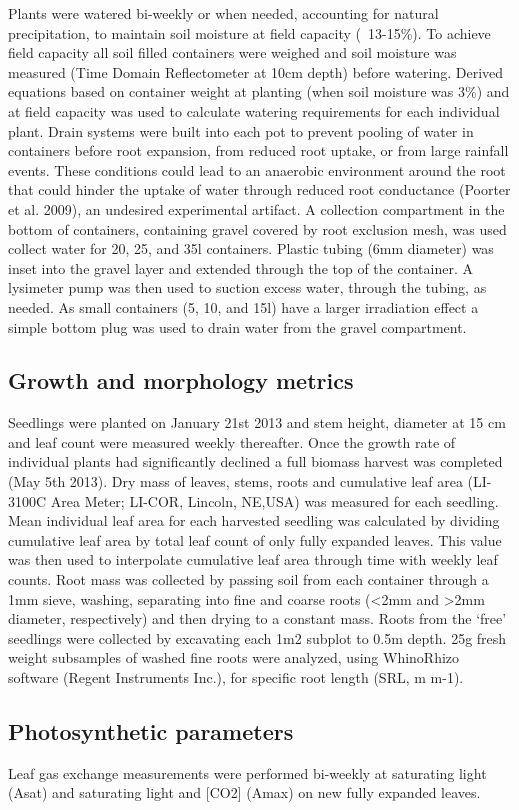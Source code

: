 \documentclass[a4paper]{article}\usepackage[]{graphicx}\usepackage[]{color}
\begin{document}
Plants were watered bi-weekly or when needed, accounting for natural precipitation, to maintain soil moisture at field capacity (~13-15\%). To achieve field capacity all soil filled containers were weighed and soil moisture was measured (Time Domain Reflectometer at 10cm depth) before watering. Derived equations based on container weight at planting (when soil moisture was 3\%) and at field capacity was used to calculate watering requirements for each individual plant. Drain systems were built into each pot to prevent pooling of water in containers before root expansion, from reduced root uptake, or from large rainfall events. These conditions could lead to an anaerobic environment around the root that could hinder the uptake of water through reduced root conductance (Poorter et al. 2009), an undesired experimental artifact. A collection compartment in the bottom of containers, containing gravel covered by root exclusion mesh, was used collect water for 20, 25, and 35l containers. Plastic tubing (6mm diameter) was inset into the gravel layer and extended through the top of the container. A lysimeter pump was then used to suction excess water, through the tubing, as needed. As small containers (5, 10, and 15l) have a larger irradiation effect a simple bottom plug was used to drain water from the gravel compartment.  

\subsection*{Growth and morphology metrics}
Seedlings were planted on January 21st 2013 and stem height, diameter at 15 cm and leaf count were measured weekly thereafter. Once the growth rate of individual plants had significantly declined a full biomass harvest was completed (May 5th 2013). Dry mass of leaves, stems, roots and cumulative leaf area (LI-3100C Area Meter; LI-COR, Lincoln, NE,USA) was measured for each seedling. Mean individual leaf area for each harvested seedling was calculated by dividing cumulative leaf area by total leaf count of only fully expanded leaves. This value was then used to interpolate cumulative leaf area through time with weekly leaf counts. Root mass was collected by passing soil from each container through a 1mm sieve, washing, separating into fine and coarse roots (<2mm and >2mm diameter, respectively) and then drying to a constant mass. Roots from the ‘free’ seedlings were collected by excavating each 1m2 subplot to 0.5m depth.  25g fresh weight subsamples of washed fine roots were analyzed, using WhinoRhizo software (Regent Instruments Inc.), for specific root length (SRL, m m-1).

\subsection*{Photosynthetic parameters}

Leaf gas exchange measurements were performed bi-weekly at saturating light (Asat) and saturating light and [CO2] (Amax) on new fully expanded leaves.  
\end{document}
